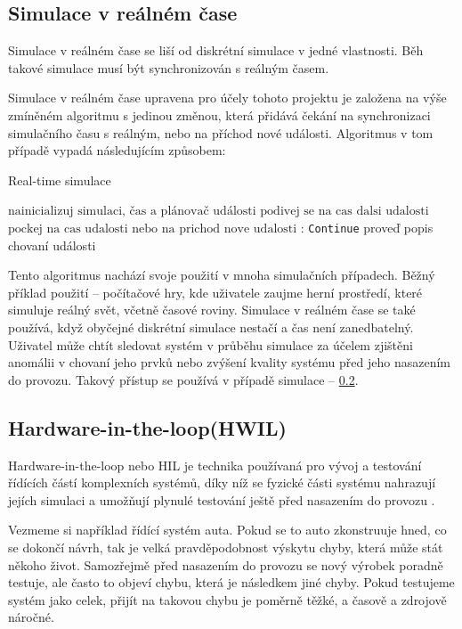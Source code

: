 \subsection{Simulace v reálném čase}
\label{subsec:real-time-sim}
Simulace v reálném čase se liší od diskrétní simulace v jedné vlastnosti. Běh takové simulace musí být synchronizován s reálným časem.

Simulace v reálném čase upravena pro účely tohoto projektu je založena na výše zmíněném algoritmu  s jedinou změnou, která přidává čekání na synchronizaci simulačního času s reálným, nebo na příchod nové události. Algoritmus v tom případě vypadá následujícím způsobem:

\begin{algorithm}
\caption{Real-time simulace}\label{real-time-alg}
\begin{algorithmic}[1]
\State $\text{nainicializuj simulaci, čas a plánovač události}$
\State $\text{podivej se na cas dalsi udalosti}$
\Return
\EndIf
\State $\text{pockej na cas udalosti nebo na prichod nove udalosti}$
:
   \State \texttt{Continue}
\EndIf
\State proveď popis chovaní události
\EndWhile
\end{algorithmic}
\end{algorithm}

Tento algoritmus nachází svoje použití v mnoha simulačních případech. Běžný příklad použití -- počítačové hry, kde uživatele zaujme herní prostředí, které simuluje reálný svět, včetně časové roviny. Simulace v reálném čase se také používá, když obyčejné diskrétní simulace nestačí a čas není zanedbatelný. Uživatel může chtít sledovat systém v průběhu simulace za účelem zjištěni anomálii v chovaní jeho prvků nebo zvýšení kvality systému před jeho nasazením do provozu. Takový přístup se používá v případě simulace  -- \ref{subsec:hwil}.

\subsection{Hardware-in-the-loop(HWIL)}
\label{subsec:hwil}

Hardware-in-the-loop nebo HIL je technika používaná pro vývoj a testování řídících částí komplexních systémů, díky níž se fyzické části systému nahrazují jejích simulaci a umožňují plynulé testování ještě před nasazením do provozu \cite{hil}.

Vezmeme si například řídící systém auta. Pokud se to auto zkonstruuje hned, co se dokončí návrh, tak je velká pravděpodobnost výskytu chyby, která může stát někoho život. Samozřejmě před nasazením do provozu se nový výrobek poradně testuje, ale často to objeví chybu, která je následkem jiné chyby. Pokud testujeme systém jako celek, přijít na takovou chybu je poměrně těžké, a časově a zdrojově náročné.

